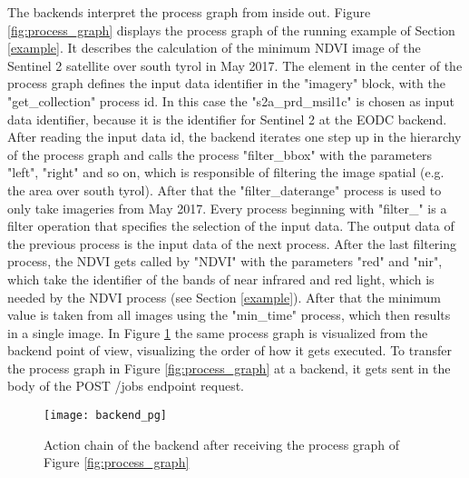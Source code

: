 \documentclass[draft,final]{vutinfth} %
\begin{document}
The backends interpret the process graph from inside out. Figure \ref{fig:process_graph} displays the process graph of the running example of Section \ref{example}. It describes the calculation of the minimum NDVI image of the Sentinel 2 satellite over south tyrol in May 2017. The element in the center of the process graph defines the input data identifier in the "imagery" block, with the "get\_collection" process id. In this case the "s2a\_prd\_msil1c" is chosen as input data identifier, because it is the identifier for Sentinel 2 at the EODC backend. After reading the input data id, the backend iterates one step up in the hierarchy of the process graph and calls the process "filter\_bbox" with the parameters "left", "right" and so on, which is responsible of filtering the image spatial (e.g. the area over south tyrol). After that the "filter\_daterange" process is used to only take imageries from May 2017. Every process beginning with "filter\_" is a filter operation that specifies the selection of the input data. The output data of the previous process is the input data of the next process. After the last filtering process, the NDVI gets called by "NDVI" with the parameters "red" and "nir", which take the identifier of the bands of near infrared and red light, which is needed by the NDVI process (see Section \ref{example}). After that the minimum value is taken from all images using the "min\_time" process, which then results in a single image. In Figure \ref{fig:process_graph_diagram} the same process graph is visualized from the backend point of view, visualizing the order of how it gets executed. To transfer the process graph in Figure \ref{fig:process_graph} at a backend, it gets sent in the body of the POST /jobs endpoint request.

\begin{figure}[h]
	\centering
	\texttt{[image: backend\_pg]}
	\caption{Action chain of the backend after receiving the process graph of Figure \ref{fig:process_graph}}
	\label{fig:process_graph_diagram} %
\end{figure}
\end{document}
